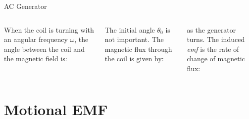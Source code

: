 \documentclass[12pt,aspectratio=169]{beamer}
\begin{document}
\begin{frame}{AC Generator}
  \begin{columns}

    When the coil is turning with an angular frequency $\omega$, the angle
    between the coil and the magnetic field is:
    

    \vspace{-.15in}The initial angle $\theta_0$ is not important. The magnetic
    flux through the coil is given by:
    

    \vspace{-.25in}as the generator turns. The induced \emph{emf} is the rate
    of change of magnetic flux:

  \end{columns}
\end{frame}



%
%
%    
%


\section{Motional EMF}
\end{document}
